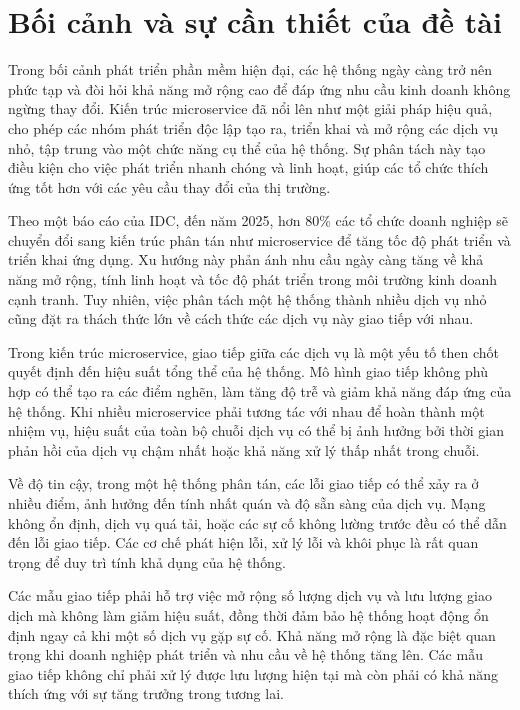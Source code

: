 \section{Bối cảnh và sự cần thiết của đề tài}
Trong bối cảnh phát triển phần mềm hiện đại, các hệ thống ngày càng trở nên
phức tạp và đòi hỏi khả năng mở rộng cao để đáp ứng nhu cầu kinh doanh không
ngừng thay đổi. Kiến trúc microservice đã nổi lên như một giải pháp hiệu quả,
cho phép các nhóm phát triển độc lập tạo ra, triển khai và mở rộng các dịch vụ
nhỏ, tập trung vào một chức năng cụ thể của hệ thống. Sự phân tách này tạo điều
kiện cho việc phát triển nhanh chóng và linh hoạt, giúp các tổ chức thích ứng
tốt hơn với các yêu cầu thay đổi của thị trường.

Theo một báo cáo của IDC, đến năm 2025, hơn 80\% các tổ chức doanh nghiệp sẽ
chuyển đổi sang kiến trúc phân tán như microservice để tăng tốc độ phát triển
và triển khai ứng dụng. Xu hướng này phản ánh nhu cầu ngày càng tăng về khả
năng mở rộng, tính linh hoạt và tốc độ phát triển trong môi trường kinh doanh
cạnh tranh. Tuy nhiên, việc phân tách một hệ thống thành nhiều dịch vụ nhỏ cũng
đặt ra thách thức lớn về cách thức các dịch vụ này giao tiếp với nhau.

Trong kiến trúc microservice, giao tiếp giữa các dịch vụ là một yếu tố then
chốt quyết định đến hiệu suất tổng thể của hệ thống. Mô hình giao tiếp không
phù hợp có thể tạo ra các điểm nghẽn, làm tăng độ trễ và giảm khả năng đáp ứng
của hệ thống. Khi nhiều microservice phải tương tác với nhau để hoàn thành một
nhiệm vụ, hiệu suất của toàn bộ chuỗi dịch vụ có thể bị ảnh hưởng bởi thời gian
phản hồi của dịch vụ chậm nhất hoặc khả năng xử lý thấp nhất trong chuỗi.

Về độ tin cậy, trong một hệ thống phân tán, các lỗi giao tiếp có thể xảy ra ở
nhiều điểm, ảnh hưởng đến tính nhất quán và độ sẵn sàng của dịch vụ. Mạng không
ổn định, dịch vụ quá tải, hoặc các sự cố không lường trước đều có thể dẫn đến
lỗi giao tiếp. Các cơ chế phát hiện lỗi, xử lý lỗi và khôi phục là rất quan
trọng để duy trì tính khả dụng của hệ thống.

Các mẫu giao tiếp phải hỗ trợ việc mở rộng số lượng dịch vụ và lưu lượng giao
dịch mà không làm giảm hiệu suất, đồng thời đảm bảo hệ thống hoạt động ổn định
ngay cả khi một số dịch vụ gặp sự cố. Khả năng mở rộng là đặc biệt quan trọng
khi doanh nghiệp phát triển và nhu cầu về hệ thống tăng lên. Các mẫu giao tiếp
không chỉ phải xử lý được lưu lượng hiện tại mà còn phải có khả năng thích ứng
với sự tăng trưởng trong tương lai.

